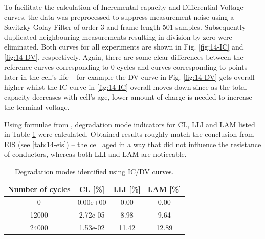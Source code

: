 To facilitate the calculation of Incremental capacity and Differential Voltage curves, the data was preprocessed to suppress measurement noise using a Savitzky-Golay Filter of order 3 and frame length 501 samples. Subsequently duplicated neighbouring measurements resulting in division by zero were eliminated.
Both curves for all experiments are shown in Fig. \ref{fig:14-IC} and \ref{fig:14-DV}, respectively. Again, there are some clear differences between the reference curves corresponding to 0 cycles and curves corresponding to points later in the cell's life -- for example the DV curve in Fig. \ref{fig:14-DV} gets overall higher whilst the IC curve in \ref{fig:14-IC} overall moves down since as the total capacity decreases with cell's age, lower amount of charge is needed to increase the terminal voltage.

Using formulae from \cite{fernandez}, degradation mode indicators for CL, LLI and LAM listed in Table \ref{tab:14-icdv} were calculated. Obtained results roughly match the conclusion from EIS (see \ref{tab:14-eis}) -- the cell aged in a way that did not influence the resistance of conductors, whereas both LLI and LAM are noticeable.







\begin{table}[]
    \centering
    \begin{tabular}{c||c|c|c}
        Number of cycles & CL [\%] & LLI [\%] & LAM [\%] \\ \hline \hline
        0 & 0.00e+00 & 0.00 & 0.00 \\
        12000 & 2.72e-05 & 8.98 & 9.64 \\
        24000 & 1.53e-02 & 11.42 & 12.89 \\

    \end{tabular}
    \caption{Degradation modes identified using IC/DV curves.}
    \label{tab:14-icdv}
\end{table}


